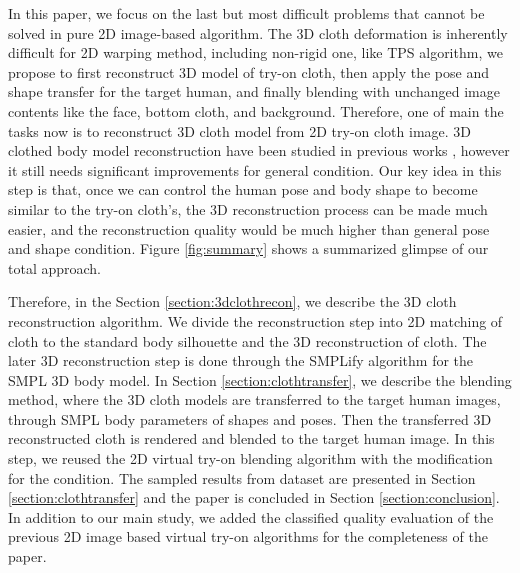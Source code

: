 In this paper, we focus on the last but most difficult problems that cannot be solved in pure 2D image-based algorithm. The 3D cloth deformation is inherently difficult for 2D warping method, including non-rigid one, like TPS algorithm, we propose to first reconstruct 3D model of try-on cloth, then apply the pose and shape transfer for the target human, and finally blending with unchanged image contents like the face, bottom cloth, and background. Therefore, one of main the tasks now is to reconstruct 3D cloth model from 2D try-on cloth image. 3D clothed body model reconstruction have been studied in previous works \cite{natsume2019siclope,saito2019pifu}, however it still needs significant improvements for general condition. Our key idea in this step is that, once we can control the human pose and body shape to become similar to the try-on cloth's, the 3D reconstruction process can be made much easier, and the reconstruction quality would be much higher than general pose and shape condition. Figure \ref{fig:summary} shows a summarized glimpse of our total approach.

Therefore, in the Section \ref{section:3dclothrecon}, we describe the 3D cloth reconstruction algorithm. We divide the reconstruction step into 2D matching of cloth to the standard body silhouette and the 3D reconstruction of cloth. The later 3D reconstruction step is done through the SMPLify\cite{Bogo2016SMPLify} algorithm for the SMPL 3D body model\cite{Loper2015SMPLAS}.  In Section \ref{section:clothtransfer}, we describe the blending method, where the 3D cloth models are transferred to the target human images, through SMPL body parameters of shapes and poses. Then the transferred 3D reconstructed cloth is rendered and blended to the target human image. In this step, we reused the 2D virtual try-on blending algorithm with the modification for the condition.  The sampled results from dataset are presented in Section \ref{section:clothtransfer} and the paper is concluded in Section \ref{section:conclusion}. In addition to our main study, we added the classified quality evaluation of the previous 2D image based virtual try-on algorithms for the completeness of the paper.


